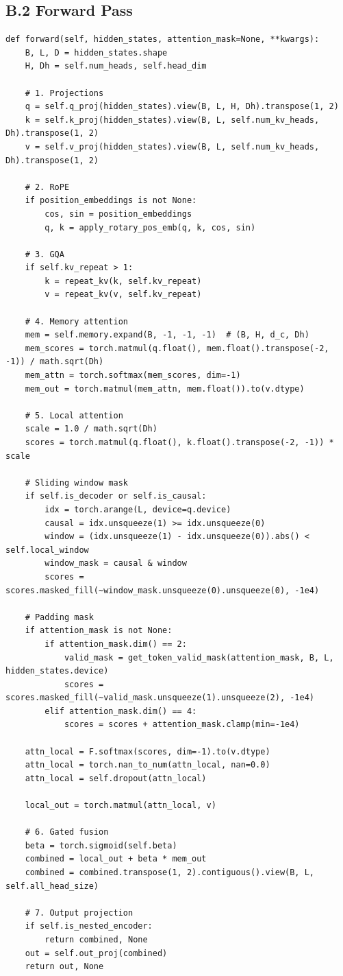 \subsection{B.2 Forward Pass}

\begin{lstlisting}
def forward(self, hidden_states, attention_mask=None, **kwargs):
    B, L, D = hidden_states.shape
    H, Dh = self.num_heads, self.head_dim
    
    # 1. Projections
    q = self.q_proj(hidden_states).view(B, L, H, Dh).transpose(1, 2)
    k = self.k_proj(hidden_states).view(B, L, self.num_kv_heads, Dh).transpose(1, 2)
    v = self.v_proj(hidden_states).view(B, L, self.num_kv_heads, Dh).transpose(1, 2)
    
    # 2. RoPE
    if position_embeddings is not None:
        cos, sin = position_embeddings
        q, k = apply_rotary_pos_emb(q, k, cos, sin)
    
    # 3. GQA
    if self.kv_repeat > 1:
        k = repeat_kv(k, self.kv_repeat)
        v = repeat_kv(v, self.kv_repeat)
    
    # 4. Memory attention
    mem = self.memory.expand(B, -1, -1, -1)  # (B, H, d_c, Dh)
    mem_scores = torch.matmul(q.float(), mem.float().transpose(-2, -1)) / math.sqrt(Dh)
    mem_attn = torch.softmax(mem_scores, dim=-1)
    mem_out = torch.matmul(mem_attn, mem.float()).to(v.dtype)
    
    # 5. Local attention
    scale = 1.0 / math.sqrt(Dh)
    scores = torch.matmul(q.float(), k.float().transpose(-2, -1)) * scale
    
    # Sliding window mask
    if self.is_decoder or self.is_causal:
        idx = torch.arange(L, device=q.device)
        causal = idx.unsqueeze(1) >= idx.unsqueeze(0)
        window = (idx.unsqueeze(1) - idx.unsqueeze(0)).abs() < self.local_window
        window_mask = causal & window
        scores = scores.masked_fill(~window_mask.unsqueeze(0).unsqueeze(0), -1e4)
    
    # Padding mask
    if attention_mask is not None:
        if attention_mask.dim() == 2:
            valid_mask = get_token_valid_mask(attention_mask, B, L, hidden_states.device)
            scores = scores.masked_fill(~valid_mask.unsqueeze(1).unsqueeze(2), -1e4)
        elif attention_mask.dim() == 4:
            scores = scores + attention_mask.clamp(min=-1e4)
    
    attn_local = F.softmax(scores, dim=-1).to(v.dtype)
    attn_local = torch.nan_to_num(attn_local, nan=0.0)
    attn_local = self.dropout(attn_local)
    
    local_out = torch.matmul(attn_local, v)
    
    # 6. Gated fusion
    beta = torch.sigmoid(self.beta)
    combined = local_out + beta * mem_out
    combined = combined.transpose(1, 2).contiguous().view(B, L, self.all_head_size)
    
    # 7. Output projection
    if self.is_nested_encoder:
        return combined, None
    out = self.out_proj(combined)
    return out, None
\end{lstlisting}

